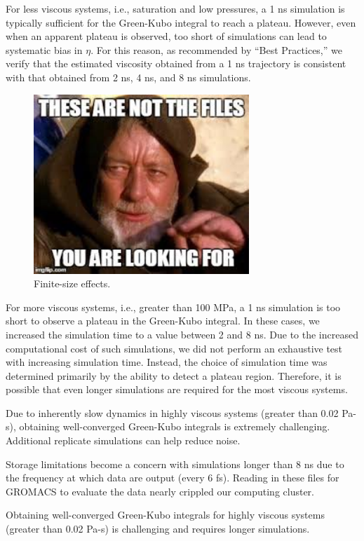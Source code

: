 \documentclass[preprint,review,12pt]{elsarticle}
\begin{document}
	For less viscous systems, i.e., saturation and low pressures, a 1 ns simulation is typically sufficient for the Green-Kubo integral to reach a plateau. However, even when an apparent plateau is observed, too short of simulations can lead to systematic bias in $\eta$. For this reason, as recommended by ``Best Practices,'' we verify that the estimated viscosity obtained from a 1 ns trajectory is consistent with that obtained from 2 ns, 4 ns, and 8 ns simulations.
	
	\begin{figure}[htb!]
		\centering
		\includegraphics[width=3.2in]{empty_figure.jpg}
		\caption{Finite-size effects.}
		\label{fig:simulation_time}
	\end{figure} 

    For more viscous systems, i.e., greater than 100 MPa, a 1 ns simulation is too short to observe a plateau in the Green-Kubo integral. In these cases, we increased the simulation time to a value between 2 and 8 ns. Due to the increased computational cost of such simulations, we did not perform an exhaustive test with increasing simulation time. Instead, the choice of simulation time was determined primarily by the ability to detect a plateau region. Therefore, it is possible that even longer simulations are required for the most viscous systems.
    
    Due to inherently slow dynamics in highly viscous systems (greater than 0.02 Pa-s), obtaining well-converged Green-Kubo integrals is extremely challenging. Additional replicate simulations can help reduce noise.
    
    Storage limitations become a concern with simulations longer than 8 ns due to the frequency at which data are output (every 6 fs). Reading in these files for GROMACS to evaluate the data nearly crippled our computing cluster.
    
    Obtaining well-converged Green-Kubo integrals for highly viscous systems (greater than 0.02 Pa-s) is challenging and requires longer simulations.
	
\end{document}
